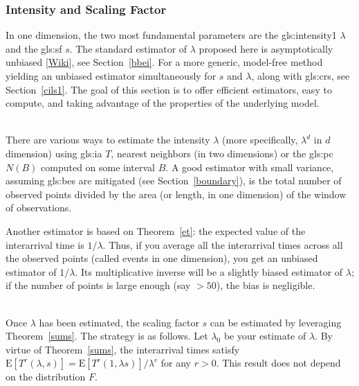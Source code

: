 \documentclass[10pt]{article}
\begin{document}
\subsubsection{Intensity and Scaling Factor}\label{estim1}

In one dimension, the two most fundamental parameters are the \gls{gls:intensity1} $\lambda$ and the \gls{gls:sf} $s$. 
The standard estimator of $\lambda$ proposed here is asymptotically unbiased [\href{https://en.wikipedia.org/wiki/Consistent_estimator}{Wiki}],
 see Section~\ref{bbei}. For a more generic, model-free method yielding an unbiased estimator simultaneously for $s$ and $\lambda$, along with \glspl{gls:cr},
see Section~\ref{cils1}. The goal of this section is to offer efficient estimators, easy to compute, and taking advantage of the properties of the underlying model. \\
\quad \\
\label{lambda1865}

\noindent There are various ways to estimate the intensity $\lambda$ (more specifically, $\lambda^d$ in $d$ dimension) 
using \gls{gls:ia} $T$, \textcolor{index}{nearest neighbors} (in two dimensions) or the \gls{gls:pc} $N(B)$ computed on some interval $B$. A good estimator with small variance, assuming \glspl{gls:be} are mitigated (see Section~\ref{boundary}), is the total number of observed points divided by the area (or length, in one dimension) of the window of observations. 

Another estimator is based on Theorem~\ref{et}: the expected value of the interarrival time is $1/\lambda$. Thus, if you average all the interarrival times across all the 
observed points (called events in one dimension), you get an unbiased estimator of $1/\lambda$. Its multiplicative inverse will be a slightly biased estimator of $\lambda$; if
the number of points is large enough (say $> 50$), the bias is negligible. \\
\quad \\

\noindent Once $\lambda$ has been estimated, the scaling factor $s$ can be estimated by leveraging Theorem~\ref{sums}. The strategy is as follows. Let $\lambda_0$ be your estimate of $\lambda$. By virtue of Theorem~\ref{sums}, the interarrival times satisfy $\mbox{E}[T^r(\lambda, s)] = \mbox{E}[T^r(1, \lambda s)] / \lambda^r$ for any $r>0$.  This result does not depend on the distribution $F$.
\end{document}
